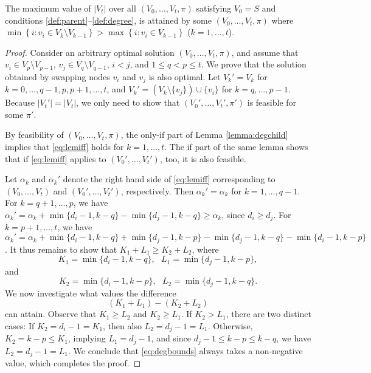 \begin{lemma}
\label{lemma:degorder}
The maximum value of $\left|V_t\right|$ over all $\left(V_0,\ldots,V_t,\pi\right)$ satisfying $V_0=S$ and
conditions \ref{def:parent}--\ref{def:degree}, is attained by some
$\left(V_0,\ldots,V_t,\pi\right)$ where \\
$\min\left\{i: v_i\in V_{k}\setminus V_{k-1}\right\}>\max\left\{i: v_i\in V_{k-1}\right\}$ ($k=1,\ldots,t$).
\end{lemma}
\begin{proof}

Consider an arbitrary optimal solution $\left(V_0,\ldots,V_t,\pi\right)$,
and assume that $v_i\in V_p\setminus V_{p-1}$, $v_j\in V_{q}\setminus V_{q-1}$, $i<j$, and $1\leq q<p\leq t$.
We prove that the solution 
obtained by swapping nodes $v_i$ and $v_j$ is also optimal.
Let $V_k'=V_k$ for $k=0,\ldots,q-1, p, p+1,\ldots,t$, and $V_k'=\left(V_k\setminus\{v_j\}\right)\cup\{v_i\}$ for $k=q,\ldots,p-1$.
Because $\left|V_t'\right|=\left|V_t\right|$, we only need to show that $\left(V_0',\ldots,V_t',\pi'\right)$ is feasible for some $\pi'$.

By feasibility of $\left(V_0,\ldots,V_t,\pi\right)$, the only-if part of Lemma \ref{lemma:degchild} implies that \eqref{eq:lemiff} holds for $k=1,\ldots,t$.
The if part of the same lemma shows that if \eqref{eq:lemiff} applies to $\left(V_0',\ldots,V_t'\right)$, too, it is also feasible.

Let $\alpha_k$ and $\alpha_k'$ denote the right hand side of \eqref{eq:lemiff} corresponding to
$\left(V_0,\ldots,V_t\right)$ and $\left(V_0',\ldots,V_t'\right)$, respectively.
Then $\alpha_k'=\alpha_k$ for $k=1,\ldots,q-1$.
For $k=q+1,\ldots,p$, we have $\alpha_k'=\alpha_k+\min\{d_i-1, k-q\}-\min\{d_j-1, k-q\}\geq \alpha_k$, since $d_i\geq d_j$.
For $k=p+1,\ldots,t$, we have $\alpha_k'=\alpha_k+\min\{d_i-1, k-q\}+\min\{d_j-1, k-p\}-\min\{d_j-1, k-q\}-\min\{d_i-1, k-p\}$.
It thus remains to show that $K_1+L_1\geq K_2+L_2$, where
$$
K_1=\min\{d_i-1,k-q\}, ~~~ L_1=\min\{d_j-1,k-p\},
$$
and
$$
K_2=\min\{d_i-1,k-p\}, ~~~ L_2=\min\{d_j-1,k-q\}.
$$
We now investigate what values the difference 
\begin{equation}
\label{eq:degbounds}
(K_1+L_1)-(K_2+L_2)
\end{equation}
can attain.
Observe that $K_1\geq L_2$ and $K_2\geq L_1$. 
If $K_2>L_1$, there are two distinct cases:
If $K_2=d_i-1=K_1$, then also $L_2=d_j-1=L_1$.
Otherwise, $K_2=k-p\leq K_1$, implying $L_1 =d_j-1$, and since $d_j-1\leq k-p\leq k-q$, we have $L_2=d_j-1=L_1$.
We conclude that \eqref{eq:degbounds} always takes a non-negative value, which completes the proof.
\end{proof}

